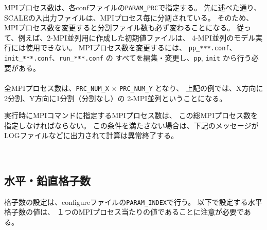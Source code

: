 MPIプロセス数は、各confファイルの\verb|PARAM_PRC|で指定する。
先に述べた通り、SCALEの入出力ファイルは、MPIプロセス毎に分割されている。
そのため、MPIプロセス数を変更すると分割ファイル数も必ず変わることになる。
従って、例えば、2-MPI並列用に作成した初期値ファイルは、
4-MPI並列のモデル実行には使用できない。
MPIプロセス数を変更するには、
\verb|pp_***.conf|、\verb|init_***.conf|、\verb|run_***.conf| の
すべてを編集・変更し、\verb|pp|, \verb|init| から行う必要がある。\\

\\


全MPIプロセス数は、\verb|PRC_NUM_X| $\times$ \verb|PRC_NUM_Y|  となり、
上記の例では、X方向に2分割、Y方向に1分割（分割なし）の
2-MPI並列ということになる。

実行時にMPIコマンドに指定するMPIプロセス数は、
この総MPIプロセス数を指定しなければならない。
この条件を満たさない場合は、下記のメッセージが
LOGファイルなどに出力されて計算は異常終了する。

\\





\subsection{水平・鉛直格子数}

格子数の設定は、configureファイルの\verb|PARAM_INDEX|で行う。
以下で設定する水平格子数の値は、
１つのMPIプロセス当たりの値であることに注意が必要である。\\

\\



